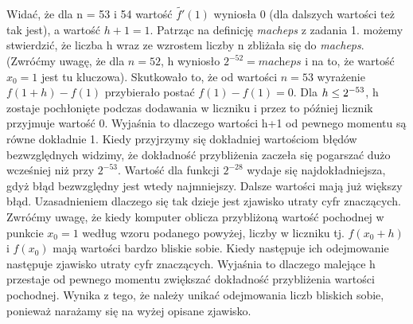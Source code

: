 \documentclass[]{article}
\begin{document}
	Widać, że dla n = 53 i 54 wartość $\widetilde{f'}(1)$ wyniosła 0 (dla dalszych wartości też tak jest), a wartość $h + 1 = 1$. Patrząc na definicję \textit{macheps} z zadania 1. możemy stwierdzić, że liczba h wraz ze wzrostem liczby n zbliżała się do \textit{macheps}. (Zwróćmy uwagę, że dla $n = 52$, h wyniosło $2^{-52} = \textit{macheps}$ i na to, że wartość $x_0 = 1$ jest tu kluczowa). Skutkowało to, że od wartości $n = 53$ wyrażenie $f(1 + h) - f(1)$ przybierało postać $f(1) - f(1) = 0$. Dla $h\space \le\space 2^{-53}$, h zostaje pochłonięte podczas dodawania w liczniku i przez to później licznik przyjmuje wartość 0. Wyjaśnia to dlaczego wartości h+1 od pewnego momentu są równe dokładnie 1.\newline
	Kiedy przyjrzymy się dokładniej wartościom błędów bezwzględnych widzimy, że dokładność przybliżenia zaczeła się pogarszać dużo wcześniej niż przy \(2^{-53}\). Wartość dla funkcji \(2^{-28}\) wydaje się najdokładniejsza, gdyż błąd bezwzględny jest wtedy najmniejszy. Dalsze wartości mają już większy błąd.
	Uzasadnieniem dlaczego się tak dzieje jest zjawisko utraty cyfr znaczących. \newline
	Zwróćmy uwagę, że kiedy komputer oblicza przybliżoną wartość pochodnej w punkcie $x_0 = 1$ według wzoru podanego powyżej, liczby w liczniku tj. $f(x_0 + h)$ i $f(x_0)$ mają wartości bardzo bliskie sobie. Kiedy następuje ich odejmowanie następuje zjawisko utraty cyfr znaczących. 
	Wyjaśnia to dlaczego malejące h przestaje od pewnego momentu zwiększać dokładność przybliżenia wartości pochodnej. Wynika z tego, że należy unikać odejmowania liczb bliskich sobie, ponieważ narażamy się na wyżej opisane zjawisko.
	
	
	
	
\end{document}
